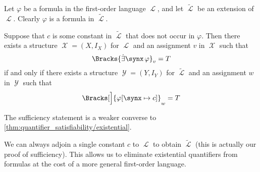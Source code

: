 \begin{proposition}\label{thm:existential_quantifier_removal}
  Let \( \varphi \) be a formula in the first-order language \( \mscrL \), and let \( \widetilde \mscrL \) be an extension of \( \mscrL \). Clearly \( \varphi \) is a formula in \( \widetilde \mscrL \).

  Suppose that \( c \) is some constant in \( \widetilde \mscrL \) that does not occur in \( \varphi \). Then there exists a structure \( \mscrX = (X, I_X) \) for \( \mscrL \) and an assignment \( v \) in \( \mscrX \) such that
  \begin{equation*}
    \Bracks{\qexists \synx \varphi}_v = T
  \end{equation*}
  if and only if there exists a structure \( \mscrY = (Y, I_Y) \) for \( \widetilde \mscrL \) and an assignment \( w \) in \( \mscrY \) such that
  \begin{equation*}
    \Bracks[\Big]{\varphi[\synx \mapsto c]}_w = T
  \end{equation*}
\end{proposition}
\begin{comments}
  \item The sufficiency statement is a weaker converse to \cref{thm:quantifier_satisfiability/existential}.
  \item We can always adjoin a single constant \( c \) to \( \mscrL \) to obtain \( \widetilde \mscrL \) (this is actually our proof of sufficiency). This allows us to eliminate existential quantifiers from formulas at the cost of a more general first-order language.
\end{comments}
